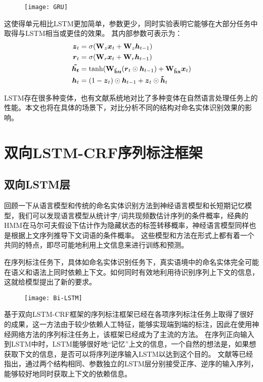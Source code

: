 \begin{figure}[H]
    \centering
    \texttt{[image: GRU]}
    \label{fig:GRU}
\end{figure}
这使得单元相比LSTM更加简单，参数更少，同时实验表明它能够在大部分任务中取得与LSTM相当或更佳的效果。
其内部参数可表示为：
\begin{align}
    \boldsymbol{z}_t &= \sigma(\boldsymbol{\mathbf{W}}_{z}\boldsymbol{x}_t + \boldsymbol{\mathbf{W}}_{z}\boldsymbol{h}_{t-1})\\
    \boldsymbol{r}_t &= \sigma(\boldsymbol{\mathbf{W}}_{r}\boldsymbol{x}_t + \boldsymbol{\mathbf{W}}_{r}\boldsymbol{h}_{t-1})\\
    \boldsymbol{\tilde{h_t}} &= \tanh(\boldsymbol{\mathbf{W_{\tilde{h}u}}}(\boldsymbol{r}_t \odot \boldsymbol{h}_{t-1}) + \boldsymbol{\mathbf{W_{\tilde{h}x}}}\boldsymbol{x}_t)\\
    \boldsymbol{h}_t &= (1 - \boldsymbol{z}_t) \odot \boldsymbol{h}_{t-1} + \boldsymbol{z}_t \odot \boldsymbol{\tilde{h}}_t
\end{align}

LSTM存在很多种变体，也有文献系统地对比了多种变体在自然语言处理任务上的性能。本文也将在具体的场景下，对比分析不同的结构对命名实体识别效果的影响。

\section{双向LSTM-CRF序列标注框架}
\subsection{双向LSTM层}
回顾一下从语言模型和传统的命名实体识别方法到神经语言模型和长短期记忆模型，我们可以发现语言模型从统计字/词共现频数估计序列的条件概率，经典的HMM在马尔可夫假设下估计作为隐藏状态的标签转移概率，神经语言模型同样也是根据上文序列推导下文词语的条件概率。
这些模型和方法在形式上都有着一个共同的特点，即尽可能地利用上文信息来进行训练和预测。

在序列标注任务下，具体如命名实体识别任务下，真实语境中的命名实体完全可能在语义和语法上同时依赖上下文。如何同时有效地利用待识别序列上下文的信息，这就给模型提出了新的要求。

\begin{figure}[H]
    \centering
    \texttt{[image: Bi-LSTM]}
    \label{fig:BiLSTM}
\end{figure}

基于双向LSTM-CRF框架的序列标注框架已经在各项序列标注任务上取得了很好的成果，这一方法由于较少依赖人工特征，能够实现端到端的标注，因此在使用神经网络方法的序列标注任务上，该框架已经成为了主流的方法。
在序列正向输入到LSTM中时，LSTM能够很好地“记忆”上文的信息，一个自然的想法是，如果想获取下文的信息，是否可以将序列逆序输入LSTM以达到这个目的。
文献\citep{huang2015bidirectional, ma2016end}等已经指出，通过两个结构相同、参数独立的LSTM层分别接受正序、逆序的输入序列，能够较好地同时获取上下文的依赖信息。

